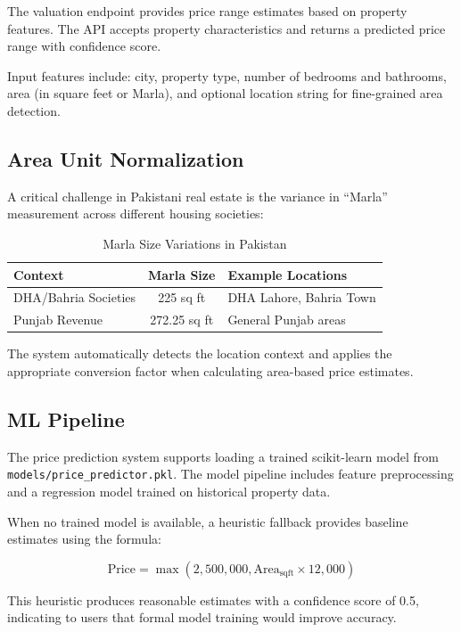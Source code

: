 The valuation endpoint provides price range estimates based on property features. The API accepts property characteristics and returns a predicted price range with confidence score.

Input features include: city, property type, number of bedrooms and bathrooms, area (in square feet or Marla), and optional location string for fine-grained area detection.

\subsection{Area Unit Normalization}

A critical challenge in Pakistani real estate is the variance in ``Marla'' measurement across different housing societies:

\begin{table}[!htbp]
\centering
\caption{Marla Size Variations in Pakistan}
\label{tab:marla-sizes}
\begin{tabular}{|l|c|l|}
\hline
\textbf{Context} & \textbf{Marla Size} & \textbf{Example Locations} \\ \hline
DHA/Bahria Societies & 225 sq ft & DHA Lahore, Bahria Town \\ \hline
Punjab Revenue & 272.25 sq ft & General Punjab areas \\ \hline
\end{tabular}
\end{table}

The system automatically detects the location context and applies the appropriate conversion factor when calculating area-based price estimates.

\subsection{ML Pipeline}

The price prediction system supports loading a trained scikit-learn model from \texttt{models/price\_predictor.pkl}. The model pipeline includes feature preprocessing and a regression model trained on historical property data.

When no trained model is available, a heuristic fallback provides baseline estimates using the formula:

$$\text{Price} = \max(2,500,000, \text{Area}_{\text{sqft}} \times 12,000)$$

This heuristic produces reasonable estimates with a confidence score of 0.5, indicating to users that formal model training would improve accuracy.


